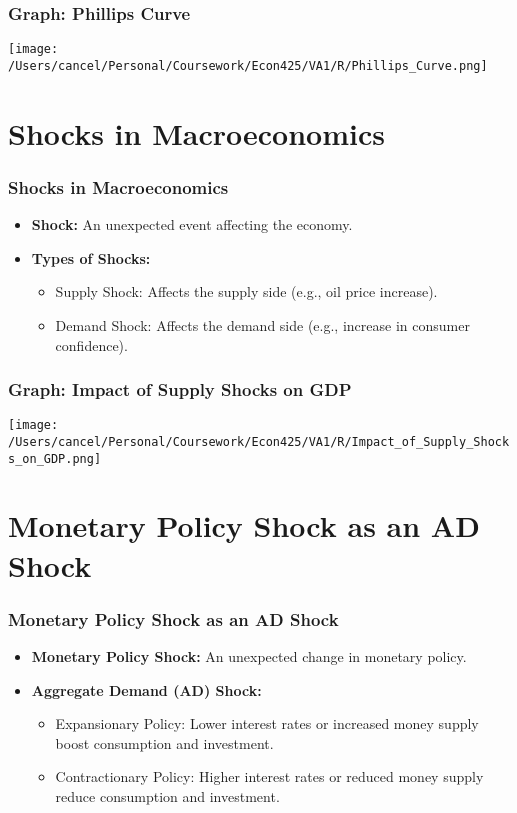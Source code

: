 \documentclass{beamer}
\begin{document}
\begin{frame}
    \frametitle{Graph: Phillips Curve}
    \begin{center}
        \texttt{[image: /Users/cancel/Personal/Coursework/Econ425/VA1/R/Phillips\_Curve.png]}
    \end{center}
\end{frame}

\section{Shocks in Macroeconomics}
\begin{frame}
    \frametitle{Shocks in Macroeconomics}
    \begin{itemize}
        \item \textbf{Shock:} An unexpected event affecting the economy.
        \item \textbf{Types of Shocks:}
        \begin{itemize}
            \item Supply Shock: Affects the supply side (e.g., oil price increase).
            \item Demand Shock: Affects the demand side (e.g., increase in consumer confidence).
        \end{itemize}
    \end{itemize}
\end{frame}

\begin{frame}
    \frametitle{Graph: Impact of Supply Shocks on GDP}
    \begin{center}
        \texttt{[image: /Users/cancel/Personal/Coursework/Econ425/VA1/R/Impact\_of\_Supply\_Shocks\_on\_GDP.png]}
    \end{center}
\end{frame}

\section{Monetary Policy Shock as an AD Shock}
\begin{frame}
    \frametitle{Monetary Policy Shock as an AD Shock}
    \begin{itemize}
        \item \textbf{Monetary Policy Shock:} An unexpected change in monetary policy.
        \item \textbf{Aggregate Demand (AD) Shock:}
        \begin{itemize}
            \item Expansionary Policy: Lower interest rates or increased money supply boost consumption and investment.
            \item Contractionary Policy: Higher interest rates or reduced money supply reduce consumption and investment.
        \end{itemize}
    \end{itemize}
\end{frame}
\end{document}
